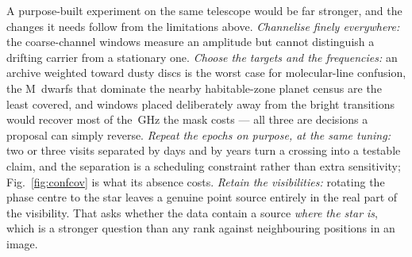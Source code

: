 A purpose-built experiment on the same telescope would be far stronger, and
the changes it needs follow from the limitations above. \emph{Channelise
finely everywhere:} the \NCoarse{} coarse-channel windows measure an amplitude
but cannot distinguish a drifting carrier from a stationary one.
\emph{Choose the targets and the frequencies:} an archive weighted toward
dusty discs is the worst case for molecular-line confusion, the M~dwarfs that
dominate the nearby habitable-zone planet census are the least covered, and
windows placed deliberately away from the bright transitions would recover
most of the \FrMaskLostGHz\,GHz the mask costs --- all three are decisions a
proposal can simply reverse. \emph{Repeat the epochs on purpose, at the same
tuning:} two or three visits separated by days and by years turn a crossing
into a testable claim, and the separation is a scheduling constraint rather
than extra sensitivity; Fig.~\ref{fig:confcov} is what its absence costs.
\emph{Retain the visibilities:} rotating the phase centre to the star leaves a
genuine point source entirely in the real part of the visibility. That asks
whether the data contain a source \emph{where the star is}, which is a
stronger question than any rank
against neighbouring positions in an image.

